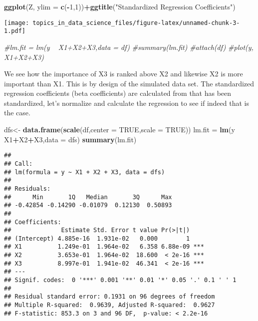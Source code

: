 \documentclass[
  11pt,
]{book}
\newenvironment{Shaded}{\begin{snugshade}}{\end{snugshade}}
\newcommand{\CommentTok}[1]{\textcolor[rgb]{0.56,0.35,0.01}{\textit{#1}}}
\newcommand{\DataTypeTok}[1]{\textcolor[rgb]{0.13,0.29,0.53}{#1}}
\newcommand{\DecValTok}[1]{\textcolor[rgb]{0.00,0.00,0.81}{#1}}
\newcommand{\KeywordTok}[1]{\textcolor[rgb]{0.13,0.29,0.53}{\textbf{#1}}}
\newcommand{\NormalTok}[1]{#1}
\newcommand{\OperatorTok}[1]{\textcolor[rgb]{0.81,0.36,0.00}{\textbf{#1}}}
\newcommand{\OtherTok}[1]{\textcolor[rgb]{0.56,0.35,0.01}{#1}}
\newcommand{\StringTok}[1]{\textcolor[rgb]{0.31,0.60,0.02}{#1}}
\begin{document}
\begin{Shaded}
\begin{Highlighting}[]
\KeywordTok{ggplot}\NormalTok{(Z, }\DataTypeTok{ylim =} \KeywordTok{c}\NormalTok{(}\OperatorTok{-}\DecValTok{1}\NormalTok{,}\DecValTok{1}\NormalTok{))}\OperatorTok{+}\KeywordTok{ggtitle}\NormalTok{(}\StringTok{"Standardized Regression Coefficients"}\NormalTok{)}
\end{Highlighting}
\end{Shaded}

\texttt{[image: topics\_in\_data\_science\_files/figure-latex/unnamed-chunk-3-1.pdf]}

\begin{Shaded}
\begin{Highlighting}[]
\CommentTok{#lm.fit = lm(y ~ X1+X2+X3,data = df)}
\CommentTok{#summary(lm.fit)}
\CommentTok{#attach(df)}
\CommentTok{#plot(y, X1+X2+X3)}
\end{Highlighting}
\end{Shaded}

We see how the importance of X3 is ranked above X2 and likewise X2 is more important than X1. This is by design of the simulated data set. The standardized regression coefficients (beta coefficients) are calculated from that has been standardized, let's normalize and calculate the regression to see if indeed that is the case.

\begin{Shaded}
\begin{Highlighting}[]
\NormalTok{dfs<-}\StringTok{ }\KeywordTok{data.frame}\NormalTok{(}\KeywordTok{scale}\NormalTok{(df,}\DataTypeTok{center =} \OtherTok{TRUE}\NormalTok{,}\DataTypeTok{scale =} \OtherTok{TRUE}\NormalTok{))}
\NormalTok{lm.fit =}\StringTok{ }\KeywordTok{lm}\NormalTok{(y }\OperatorTok{~}\StringTok{ }\NormalTok{X1}\OperatorTok{+}\NormalTok{X2}\OperatorTok{+}\NormalTok{X3,}\DataTypeTok{data =}\NormalTok{ dfs)}
\KeywordTok{summary}\NormalTok{(lm.fit)}
\end{Highlighting}
\end{Shaded}

\begin{verbatim}
## 
## Call:
## lm(formula = y ~ X1 + X2 + X3, data = dfs)
## 
## Residuals:
##      Min       1Q   Median       3Q      Max 
## -0.42854 -0.14290 -0.01079  0.12130  0.50893 
## 
## Coefficients:
##              Estimate Std. Error t value Pr(>|t|)    
## (Intercept) 4.885e-16  1.931e-02   0.000        1    
## X1          1.249e-01  1.964e-02   6.358 6.88e-09 ***
## X2          3.653e-01  1.964e-02  18.600  < 2e-16 ***
## X3          8.997e-01  1.941e-02  46.341  < 2e-16 ***
## ---
## Signif. codes:  0 '***' 0.001 '**' 0.01 '*' 0.05 '.' 0.1 ' ' 1
## 
## Residual standard error: 0.1931 on 96 degrees of freedom
## Multiple R-squared:  0.9639, Adjusted R-squared:  0.9627 
## F-statistic: 853.3 on 3 and 96 DF,  p-value: < 2.2e-16
\end{verbatim}
\end{document}
